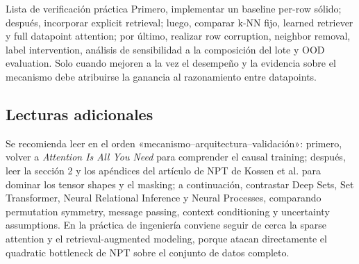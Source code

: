 \documentclass[a4paper]{article}
\begin{document}
\begin{knowledgebox}{Lista de verificación práctica}
Primero, implementar un baseline per-row sólido; después, incorporar explicit retrieval; luego, comparar k-NN fijo, learned retriever y full datapoint attention; por último, realizar row corruption, neighbor removal, label intervention, análisis de sensibilidad a la composición del lote y OOD evaluation. Solo cuando mejoren a la vez el desempeño y la evidencia sobre el mecanismo debe atribuirse la ganancia al razonamiento entre datapoints.
\end{knowledgebox}

\subsection{Lecturas adicionales}

Se recomienda leer en el orden «mecanismo--arquitectura--validación»: primero, volver a \emph{Attention Is All You Need} para comprender el causal training; después, leer la sección 2 y los apéndices del artículo de NPT de Kossen et al. para dominar los tensor shapes y el masking; a continuación, contrastar Deep Sets, Set Transformer, Neural Relational Inference y Neural Processes, comparando permutation symmetry, message passing, context conditioning y uncertainty assumptions. En la práctica de ingeniería conviene seguir de cerca la sparse attention y el retrieval-augmented modeling, porque atacan directamente el quadratic bottleneck de NPT sobre el conjunto de datos completo.

\end{document}
